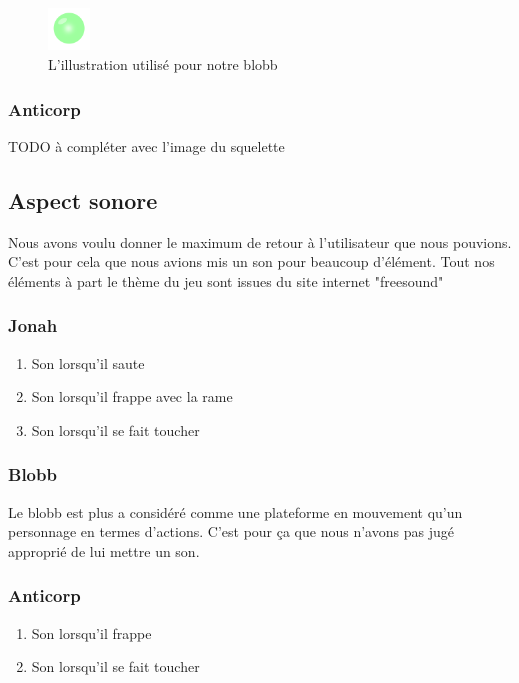 \documentclass{prologArticle}
\begin{document}
\begin{figure}[H]
    \centering
    \includegraphics[width=0.1\textwidth]{res/blobb.png}
    \caption{L'illustration utilisé pour notre blobb}
\end{figure}

\subsubsection{Anticorp}
TODO à compléter avec l'image du squelette

\subsection{Aspect sonore}
Nous avons voulu donner le maximum de retour à l'utilisateur que nous pouvions. C'est pour cela que nous avions mis un son pour beaucoup d'élément. Tout nos éléments à part le thème du jeu sont issues du site internet "freesound"

\subsubsection{Jonah}
\begin{enumerate}
    \item Son lorsqu'il saute
    \item Son lorsqu'il frappe avec la rame
    \item Son lorsqu'il se fait toucher
\end{enumerate}

\subsubsection{Blobb}
Le blobb est plus a considéré comme une plateforme en mouvement qu'un personnage en termes d'actions. C'est pour ça que nous n'avons pas jugé approprié de lui mettre un son.

\subsubsection{Anticorp}
\begin{enumerate}
    \item Son lorsqu'il frappe
    \item Son lorsqu'il se fait toucher
\end{enumerate}
\end{document}
